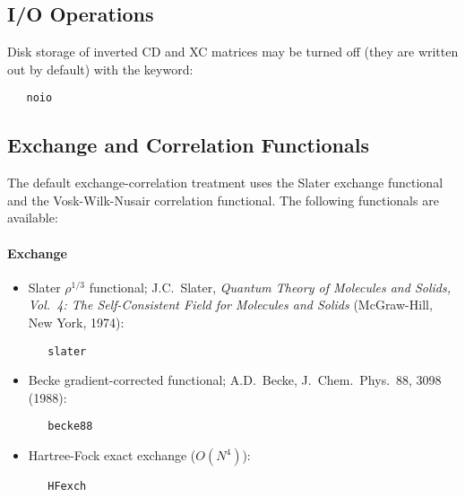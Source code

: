 \subsection{I/O Operations}

Disk storage of inverted CD and XC matrices may be turned off 
(they are written out by default) with the keyword:
\begin{verbatim}
   noio
\end{verbatim}

\subsection{Exchange and Correlation Functionals}
The default exchange-correlation treatment uses the Slater exchange 
functional and the Vosk-Wilk-Nusair correlation functional.
The following functionals are available:
\paragraph{Exchange}
\begin{itemize}
\item  Slater $\rho^{1/3}$ functional; J.C.~Slater, 
  {\sl Quantum Theory of Molecules and
  Solids, Vol.~4: The Self-Consistent Field for Molecules and Solids}
(McGraw-Hill, New York, 1974):
\begin{verbatim}
   slater
\end{verbatim}
\item Becke gradient-corrected functional; 
  A.D.~Becke, J.~Chem.~Phys.~88, 3098 (1988):
\begin{verbatim}
   becke88
\end{verbatim}
\item Hartree-Fock exact exchange ($O(N^4)$):
\begin{verbatim}
   HFexch
\end{verbatim}
\end{itemize}

